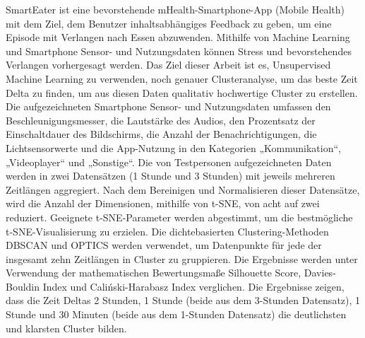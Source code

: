 SmartEater ist eine bevorstehende mHealth-Smartphone-App (Mobile Health) mit dem Ziel, dem Benutzer inhaltsabhängiges Feedback zu geben, um eine Episode mit Verlangen nach Essen abzuwenden. Mithilfe von Machine Learning und Smartphone Sensor- und Nutzungsdaten können Stress und bevorstehendes Verlangen vorhergesagt werden. Das Ziel dieser Arbeit ist es, Unsupervised Machine Learning zu verwenden, noch genauer Clusteranalyse, um das beste Zeit Delta zu finden, um aus diesen Daten qualitativ hochwertige Cluster zu erstellen. Die aufgezeichneten Smartphone Sensor- und Nutzungsdaten umfassen den Beschleunigungsmesser, die Lautstärke des Audios, den Prozentsatz der Einschaltdauer des Bildschirms, die Anzahl der Benachrichtigungen, die Lichtsensorwerte und die App-Nutzung in den Kategorien „Kommunikation“, „Videoplayer“ und „Sonstige“. Die von Testpersonen aufgezeichneten Daten werden in zwei Datensätzen (1 Stunde und 3 Stunden) mit jeweils mehreren Zeitlängen aggregiert. Nach dem Bereinigen und Normalisieren dieser Datensätze, wird die Anzahl der Dimensionen, mithilfe von t-SNE, von acht auf zwei reduziert. Geeignete t-SNE-Parameter werden abgestimmt, um die bestmögliche t-SNE-Visualisierung zu erzielen. Die dichtebasierten Clustering-Methoden DBSCAN und OPTICS werden verwendet, um Datenpunkte für jede der insgesamt zehn Zeitlängen in Cluster zu gruppieren. Die Ergebnisse werden unter Verwendung der mathematischen Bewertungsmaße Silhouette Score, Davies-Bouldin Index und Caliński-Harabasz Index verglichen. Die Ergebnisse zeigen, dass die Zeit Deltas 2 Stunden, 1 Stunde (beide aus dem 3-Stunden Datensatz), 1 Stunde und 30 Minuten (beide aus dem 1-Stunden Datensatz) die deutlichsten und klarsten Cluster bilden.